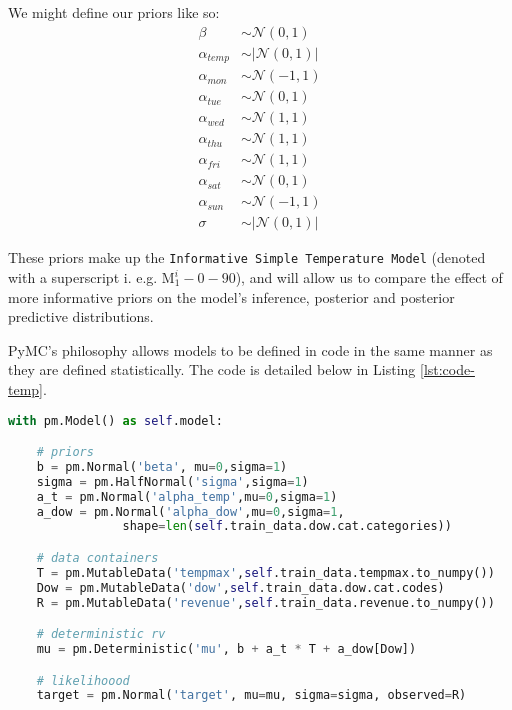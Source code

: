 We might define our priors like so: 
\begin{equation}
  \label{eq:simple_tempv2_priors}
  \begin{split}
    \beta & \sim \mathcal{N}(0, 1) \\
    \alpha_{temp} & \sim \left| \mathcal{N}(0,1) \right| \\
    \alpha_{mon} & \sim \mathcal{N}(-1, 1) \\
    \alpha_{tue} & \sim \mathcal{N}(0, 1) \\
    \alpha_{wed} & \sim \mathcal{N}(1, 1) \\
    \alpha_{thu} & \sim \mathcal{N}(1, 1) \\
    \alpha_{fri} & \sim \mathcal{N}(1, 1) \\
    \alpha_{sat} & \sim \mathcal{N}(0, 1) \\
    \alpha_{sun} & \sim \mathcal{N}(-1, 1) \\
    \sigma & \sim \left| \mathcal{N}(0,1) \right|
  \end{split}
\end{equation}

These priors make up the \texttt{Informative Simple Temperature Model} (denoted
with a superscript i. e.g. $\text{M}_1^i-0-90$), and will allow us to compare
the effect of more informative priors on the model's inference, posterior and
posterior predictive distributions.

PyMC's philosophy allows models to be defined in code in the same manner as they are defined statistically.
The code is detailed below in Listing \ref{lst:code-temp}. 

\begin{lstlisting}[language=Python, caption=PyMC implementation of the Simple Temperature Model, label=lst:code-temp]
with pm.Model() as self.model:

    # priors
    b = pm.Normal('beta', mu=0,sigma=1)
    sigma = pm.HalfNormal('sigma',sigma=1)
    a_t = pm.Normal('alpha_temp',mu=0,sigma=1)
    a_dow = pm.Normal('alpha_dow',mu=0,sigma=1,
                shape=len(self.train_data.dow.cat.categories))

    # data containers
    T = pm.MutableData('tempmax',self.train_data.tempmax.to_numpy())
    Dow = pm.MutableData('dow',self.train_data.dow.cat.codes)
    R = pm.MutableData('revenue',self.train_data.revenue.to_numpy())

    # deterministic rv
    mu = pm.Deterministic('mu', b + a_t * T + a_dow[Dow])

    # likelihoood 
    target = pm.Normal('target', mu=mu, sigma=sigma, observed=R)

\end{lstlisting}

